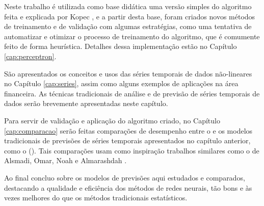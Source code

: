 Neste trabalho é utilizada como base didática uma versão simples do algoritmo  feita e explicada por Kopec \citep{classic}, e a partir desta base, foram criados novos métodos de treinamento e de validação com algumas estratégias, como uma tentativa de automatizar e otimizar o processo de treinamento do algoritmo, que é comumente feito de forma heurística. Detalhes dessa implementação estão no Capítulo \ref{cap:perceptron}.

São apresentados os conceitos e usos das séries temporais de dados não-lineares no Capítulo \ref{cap:series}, assim como alguns exemplos de aplicações na área financeira. As técnicas tradicionais de análise e de previsão de séries temporais de dados serão brevemente apresentadas neste capítulo.

Para servir de validação e aplicação do algoritmo criado, no Capítulo \ref{cap:comparacao} serão feitas comparações de desempenho entre o  e os modelos tradicionais de previsões de séries temporais apresentados no capítulo anterior, como o  (). Tais comparações usam como inspiração trabalhos similares como o de Alsmadi, Omar, Noah e Almarashdah \citep{4809024}.

Ao final concluo sobre os modelos de previsões aqui estudados e comparados, destacando a qualidade e eficiência dos métodos de redes neurais, tão bons e às vezes melhores do que os métodos tradicionais estatísticos.

